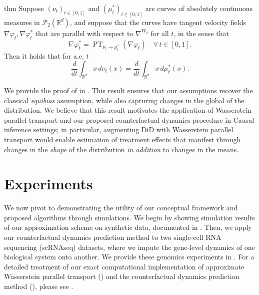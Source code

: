 \documentclass[11pt]{article}
\newcommand{\PT}{\operatorname{PT}}
\begin{document}
\begin{restatable}{thm}{} \label{pt recovers parallel trends}
    Suppose $(\nu_t)_{t \in [0,1]}$ and $(\mu_t^*)_{t\in [0,1]}$ are curves of absolutely continuous measures in $\mathcal{P}_2(\mathbb{R}^d)$, and suppose that the curves have tangent velocity fields $\nabla \varphi_t, \nabla\varphi_t^*$ that are parallel with respect to $\nabla^{W_2}$ for all $t$, in the sense that 
    \[\nabla\varphi_t^* = {\PT}_{\nu_t \rightarrow \mu_t^*}(\nabla\varphi_t) \quad \forall \, t\in [0,1].\]
    Then it holds that for a.e. $t$ 
    \[ \frac{d}{dt}\int_{\mathbb{R}^d}x \,d\nu_t(x) = \frac{d}{dt} \int_{\mathbb{R}^d} x\, d\mu_t^*(x).\] 
\end{restatable}
We provide the proof of  in . This result ensures that our assumptions recover the classical \textit{equibias} assumption, while also capturing changes in the global  of the distribution. We believe that this result motivates the application of Wasserstein parallel transport and our proposed counterfactual dynamics procedure in Causal inference settings; in particular, augmenting DiD with Wasserstein parallel transport would enable estimation of treatment effects that manifest through changes in the \textit{shape} of the distribution \textit{in addition} to changes in the means.

\section{Experiments}\label{sec: experiments}

We now pivot to demonstrating the utility of our conceptual framework and proposed algorithms through simulations. We begin by showing simulation results of our approximation scheme on synthetic data, documented in . Then, we apply our counterfactual dynamics prediction method to two single-cell RNA sequencing (scRNAseq) datasets, where we impute the gene-level dynamics of one biological system onto another. We provide these genomics experiments in . For a detailed treatment of our exact computational implementation of approximate Wasserstein parallel transport () and the counterfactual dynamics prediction method (), please see . 
\end{document}
